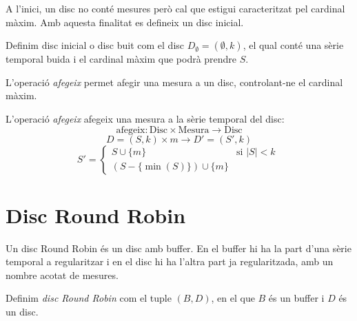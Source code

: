A l'inici, un disc no conté mesures però cal que estigui caracteritzat pel cardinal màxim. Amb aquesta finalitat es defineix un disc inicial.

\begin{definition}\label{def:disc_buit}
  Definim disc inicial o disc buit com el disc $D_{\emptyset} =
  (\emptyset,k)$, el qual conté una sèrie temporal buida i el cardinal
  màxim que podrà prendre $S$.
\end{definition}

L'operació \emph{afegeix} permet afegir una mesura a un disc, controlant-ne el cardinal màxim.

\begin{definition}
  L'operació \emph{afegeix} afegeix una mesura a la sèrie temporal del disc:
  \[
  \text{afegeix}: \text{Disc} \times \text{Mesura} \longrightarrow \text{Disc}
  \]
  \[
  D=(S,k) \times m \longrightarrow D'= (S',k)
  \]
  \[
  S' =  
  \begin{cases}
      S\cup\{m\} &\text{si }  |S|<k\\
      (S-\{\min(S)\}) \cup \{m\} 
    \end{cases}  \
  \]
\end{definition}


\section{Disc Round Robin}\label{sec:model:discroundrobin}

Un disc Round Robin és un disc amb buffer. En el buffer hi ha la part d'una sèrie temporal a regularitzar i en el disc hi ha l'altra part ja regularitzada, amb un nombre acotat de mesures. 

\begin{definition}
  Definim \emph{disc Round Robin} com el tuple $(B,D)$, en el que $B$
  és un buffer i $D$ és un disc.
\end{definition}
 
